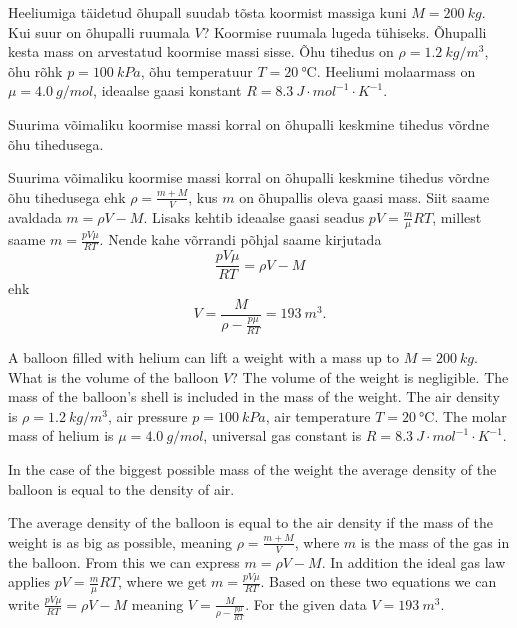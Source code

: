 
Heeliumiga täidetud õhupall suudab tõsta koormist massiga kuni $M=\SI{200}{kg}$. Kui suur on õhupalli ruumala $V$? Koormise ruumala lugeda tühiseks. Õhupalli kesta mass on arvestatud koormise massi sisse. Õhu tihedus on $\rho=\SI{1.2}{kg\per m^3}$, õhu rõhk $p=\SI{100}{kPa}$, õhu temperatuur $T=\SI{20}{\degreeCelsius}$. Heeliumi molaarmass on $\mu=\SI{4.0}{g\per mol}$, ideaalse gaasi konstant $R=\SI{8.3}{J\cdot mol^{-1}\cdot K^{-1}}$.

\hint
Suurima võimaliku koormise massi korral on õhupalli keskmine tihedus võrdne õhu tihedusega.

\solu
Suurima võimaliku koormise massi korral on õhupalli keskmine tihedus võrdne õhu tihedusega ehk $\rho=\frac{m+M}{V}$, kus $m$ on õhupallis oleva gaasi mass. Siit saame avaldada $m=\rho V-M$. Lisaks kehtib ideaalse gaasi seadus $pV=\frac{m}{\mu}RT$, millest saame $m=\frac{pV\mu}{RT}$. Nende kahe võrrandi põhjal saame kirjutada
\[
\frac{pV\mu}{RT}=\rho V-M
\]
ehk
\[
V=\frac{M}{\rho-\frac{p\mu}{RT}}=\SI{193}{m^3}.
\]

A balloon filled with helium can lift a weight with a mass up to $M=\SI{200}{kg}$. What is the volume of the balloon $V$? The volume of the weight is negligible. The mass of the balloon’s shell is included in the mass of the weight. The air density is $\rho=\SI{1.2}{kg\per m^3}$, air pressure $p=\SI{100}{kPa}$, air temperature $T=\SI{20}{\degreeCelsius}$. The molar mass of helium is $\mu=\SI{4.0}{g\per mol}$, universal gas constant is $R=\SI{8.3}{J\cdot mol^{-1}\cdot K^{-1}}$.

\hinteng
In the case of the biggest possible mass of the weight the average density of the balloon is equal to the density of air.

\solueng
The average density of the balloon is equal to the air density if the mass of the weight is as big as possible, meaning $\rho=\frac{m+M}{V}$, where $m$ is the mass of the gas in the balloon. From this we can express $m=\rho V-M$. In addition the ideal gas law applies $pV=\frac{m}{\mu}RT$, where we get $m=\frac{pV\mu}{RT}$. Based on these two equations we can write $\frac{pV\mu}{RT}=\rho V-M$ meaning $V=\frac{M}{\rho-\frac{p\mu}{RT}}$. For the given data $V=\SI{193}{m^3}$.
\probend